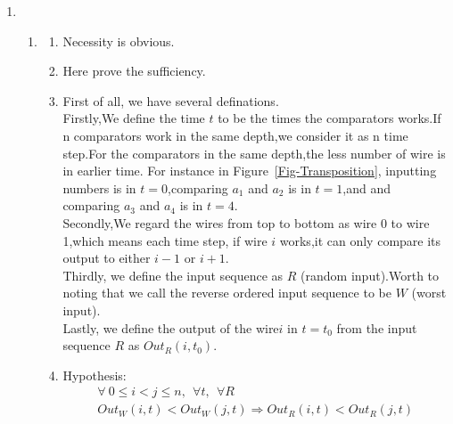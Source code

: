 \documentclass[12pt,a4paper]{article}
\makeatletter
\newtheorem*{solution}{Solution}
\theoremstyle{definition}
\renewenvironment{solution}[1][Solution] {\par\pushQED{\qed}\normalfont\topsep6\p@\@plus6\p@\relax\trivlist\item[\hskip\labelsep\bfseries#1\@addpunct{.}]\ignorespaces}{\popQED\endtrivlist\@endpefalse} \makeatother
\makeatother
\begin{document}
\begin{enumerate}
\begin{solution}
    ~\par
\begin{enumerate} 
    \item 
    \begin{enumerate}
        \item Necessity is obvious.
        \item Here prove the sufficiency.
        \item First of all, we have several definations.\\
        Firstly,We define the time $t$ to be the times the comparators works.If n comparators work in the same depth,we consider it as n time step.For the comparators in the same depth,the less number of wire is in earlier time.  For instance in Figure~\ref{Fig-Transposition}, inputting numbers is in $t=0$,comparing $a_1$ and $a_2$ is in $t=1$,and and comparing $a_3$ and $a_4$ is in $t=4$.\\
        Secondly,We regard the wires from top to bottom as wire 0 to wire 1,which means each time step, if wire $i$ works,it can only compare its output to either $i-1$ or $i+1$.\\
        Thirdly, we define the input sequence as $R$ (random input).Worth to noting that we call the reverse ordered input sequence to be $W$ (worst input).\\
        Lastly, we define the output of the wire$i$ in $t=t_0$ from the input sequence $R$ as $Out_R(i,t_0)$.
        \item Hypothesis:
        \begin{equation}
        \begin{aligned}
            \forall~ 0\le i<j\le n,~~\forall t,~~\forall R~~~~~~~~~~~~~~~~~~~~~~~~~~~~~~~\\
            Out_W(i,t)<Out_W(j,t)\Rightarrow Out_R(i,t)<Out_R(j,t)

\end{aligned}
\end{equation}
\end{enumerate}
\end{enumerate}
\end{solution}
\end{enumerate}
\end{document}
